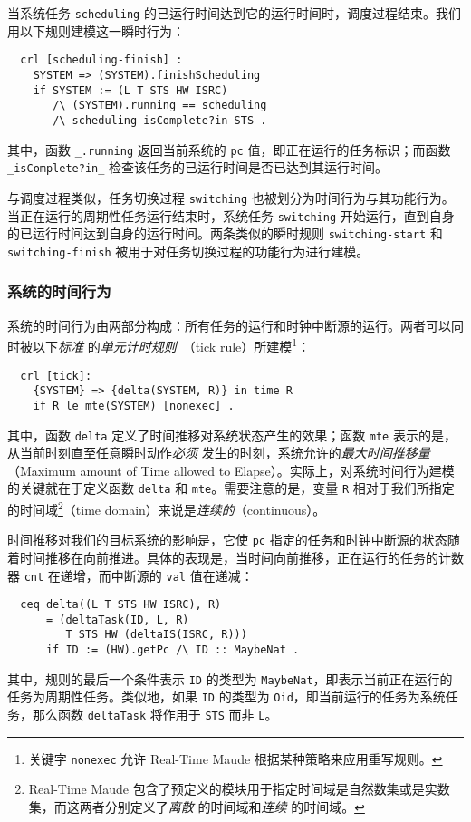 当系统任务 \verb|scheduling| 的已运行时间达到它的运行时间时，调度过程结束。我们用以下规则建模这一瞬时行为：
\begin{verbatim}
  crl [scheduling-finish] :
    SYSTEM => (SYSTEM).finishScheduling
    if SYSTEM := (L T STS HW ISRC) 
       /\ (SYSTEM).running == scheduling 
       /\ scheduling isComplete?in STS .
\end{verbatim}
其中，函数 \verb|_.running| 返回当前系统的 \verb|pc| 值，即正在运行的任务标识；而函数 \verb|_isComplete?in_| 检查该任务的已运行时间是否已达到其运行时间。

与调度过程类似，任务切换过程 \verb|switching| 也被划分为时间行为与其功能行为。当正在运行的周期性任务运行结束时，系统任务 \verb|switching| 开始运行，直到自身的已运行时间达到自身的运行时间。两条类似的瞬时规则 \verb|switching-start| 和 \verb|switching-finish| 被用于对任务切换过程的功能行为进行建模。


\subsubsection{系统的时间行为}
\label{ss:timedbehavior}

系统的时间行为由两部分构成：所有任务的运行和时钟中断源的运行。两者可以同时被以下\emph{标准} 的\emph{单元计时规则}~\cite{DBLP:journals/entcs/OlveczkyM07a}（tick rule）所建模\footnote{关键字 \texttt{nonexec} 允许 Real-Time Maude 根据某种策略来应用重写规则。}：
\begin{verbatim}
  crl [tick]:
    {SYSTEM} => {delta(SYSTEM, R)} in time R 
    if R le mte(SYSTEM) [nonexec] .
\end{verbatim}
其中，函数 \verb|delta| 定义了时间推移对系统状态产生的效果；函数 \verb|mte| 表示的是，从当前时刻直至任意瞬时动作\emph{必须} 发生的时刻，系统允许的\emph{最大时间推移量} （Maximum amount of Time allowed to Elapse）。实际上，对系统时间行为建模的关键就在于定义函数 \verb|delta| 和 \verb|mte|。需要注意的是，变量 \verb|R| 相对于我们所指定的时间域\footnote{Real-Time Maude 包含了预定义的模块用于指定时间域是自然数集或是实数集，而这两者分别定义了\emph{离散} 的时间域和\emph{连续} 的时间域。}（time domain）来说是\emph{连续的}（continuous）。

时间推移对我们的目标系统的影响是，它使 \verb|pc| 指定的任务和时钟中断源的状态随着时间推移在向前推进。具体的表现是，当时间向前推移，正在运行的任务的计数器 \verb|cnt| 在递增，而中断源的 \verb|val| 值在递减：
\begin{verbatim}
  ceq delta((L T STS HW ISRC), R)
      = (deltaTask(ID, L, R) 
         T STS HW (deltaIS(ISRC, R)))
      if ID := (HW).getPc /\ ID :: MaybeNat .
\end{verbatim}
其中，规则的最后一个条件表示 \verb|ID| 的类型为 \verb|MaybeNat|，即表示当前正在运行的任务为周期性任务。类似地，如果 \verb|ID| 的类型为 \verb|Oid|，即当前运行的任务为系统任务，那么函数 \verb|deltaTask| 将作用于 \verb|STS| 而非 \verb|L|。

